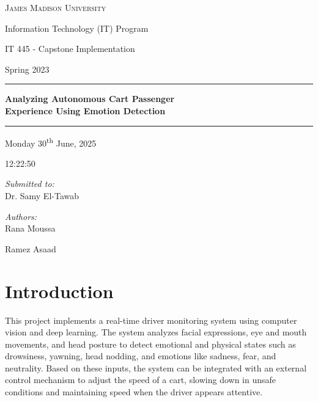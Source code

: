 \documentclass[12pt]{article}
\begin{document}
{
\begin{titlepage}
    \centering
    \vspace{1cm}
    {\Large\scshape James Madison University \par}
    \vspace{0.5cm}
    {\large Information Technology (IT) Program \par}
    {\large IT 445 - Capstone Implementation \par}
    {\large Spring 2023 \par}
    \vspace{1cm}
    \rule{\textwidth}{0.5pt}
    \vspace{0.5cm}
    {\bfseries\LARGE Analyzing Autonomous Cart Passenger\\[0.2cm]
    Experience Using Emotion Detection \par}
    \vspace{0.5cm}
    \rule{\textwidth}{0.5pt}
    \vspace{0.8cm}
    {\large Monday 30\textsuperscript{th} June, 2025 \par}
    {\large 12:22:50 \par}
    \vspace{0.5cm}
    \begin{minipage}{0.3\textwidth}
        \raggedright
        \textit{Submitted to:}\\
        Dr. Samy El-Tawab
    \end{minipage}
    \begin{minipage}{0.45\textwidth}
        \raggedleft
        \textit{Authors:}\\
        Rana Moussa \par Ramez Asaad
    \end{minipage}
    \vfill
\end{titlepage}
\restoregeometry}

\geometry{a4paper, margin=0.7in}

\section{Introduction}
This project implements a real-time driver monitoring system using computer vision and deep learning. The system analyzes facial expressions, eye and mouth movements, and head posture to detect emotional and physical states such as drowsiness, yawning, head nodding, and emotions like sadness, fear, and neutrality. Based on these inputs, the system can be integrated with an external control mechanism to adjust the speed of a cart, slowing down in unsafe conditions and maintaining speed when the driver appears attentive.
\usetikzlibrary{shapes.geometric, arrows.meta}
\end{document}
